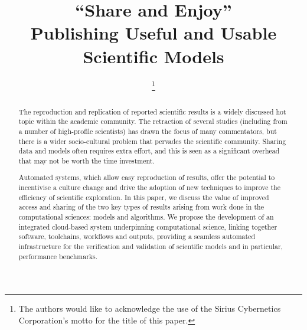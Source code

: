 \documentclass[conference]{IEEEtran}
\begin{document}

\title{``Share and Enjoy''\\Publishing Useful and Usable Scientific Models}

\author{
%
\thanks{The authors would like to acknowledge the use of the Sirius Cybernetics
  Corporation's motto for the title of this paper. }
\and
{}
}

\maketitle

\begin{abstract}
The reproduction and replication of reported scientific results is a
widely discussed hot topic within the academic community. The
retraction of several studies (including from a number of high-profile
scientists) has drawn the focus of many commentators, but there is a
wider socio-cultural problem that pervades the scientific community. 
Sharing data and models often requires extra effort, and this is seen 
as a significant overhead that may not be worth the time investment.

Automated systems, which allow easy reproduction of results, offer the
potential to incentivise a culture change and drive the adoption of
new techniques to improve the efficiency of scientific exploration. In
this paper, we discuss the value of improved access and sharing of the
two key types of results arising from work done in the computational
sciences: models and algorithms. We propose the development of an
integrated cloud-based system underpinning computational science,
linking together software, toolchains, workflows and outputs,
providing a seamless automated infrastructure for the verification and
validation of scientific models and in particular, performance
benchmarks.
\end{abstract}
\end{document}
